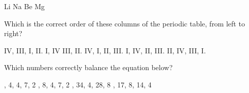 \documentclass[11pt]{exam}
\begin{document}
\begin{questions}
\begin{choices}
    \choice Li
    \choice Na
    \choice Be
    \choice Mg
\end{choices}
\answerline

\question Which is the correct order of these columns of the periodic table, from left to right?

\hspace{.5cm}

\begin{choices}
    \choice IV, III, I, II.
    \choice I, IV III, II.
    \choice IV, I, II, III.
    \choice I, IV, II, III.
    \choice II, IV, III, I.
\end{choices}
\answerline

\question Which numbers correctly balance the equation below?

\hspace{.5cm}

\begin{choices}
    , 4, 4, 7, 2
    , 8, 4, 7, 2
    , 34, 4, 28, 8
    , 17, 8, 14, 4 
\end{choices}
\answerline

\end{questions}
\end{document}
